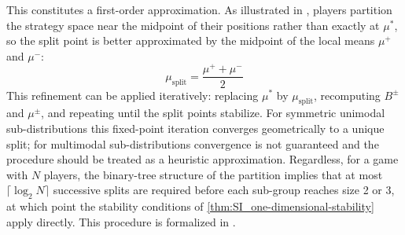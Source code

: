 \documentclass{article}
\begin{document}
                This constitutes a first-order approximation. As illustrated in , players partition the strategy space near the midpoint of their positions rather than exactly at $\mu^*$, so the split point is better approximated by the midpoint of the local means $\mu^+$ and $\mu^-$:
                \begin{equation}
                    \mu_{\mathrm{split}} = \frac{\mu^+ + \mu^-}{2}
                \end{equation}
                This refinement can be applied iteratively: replacing $\mu^*$ by $\mu_{\mathrm{split}}$, recomputing $B^\pm$ and $\mu^\pm$, and repeating until the split points stabilize. For symmetric unimodal sub-distributions this fixed-point iteration converges geometrically to a unique split; for multimodal sub-distributions convergence is not guaranteed and the procedure should be treated as a heuristic approximation. Regardless, for a game with $N$ players, the binary-tree structure of the partition implies that at most $\lceil \log_2 N \rceil$ successive splits are required before each sub-group reaches size 2 or 3, at which point the stability conditions of \cref{thm:SI_one-dimensional-stability} apply directly. This procedure is formalized in .
\end{document}
